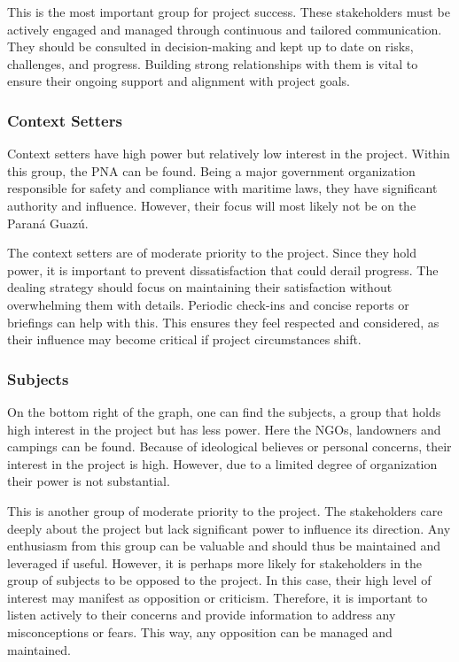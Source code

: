 This is the most important group for project success. These stakeholders must be actively engaged and managed through continuous and tailored communication. They should be consulted in decision-making and kept up to date on risks, challenges, and progress. Building strong relationships with them is vital to ensure their ongoing support and alignment with project goals.

\subsubsection{Context Setters}
Context setters have high power but relatively low interest in the project. Within this group, the PNA can be found. Being a major government organization responsible for safety and compliance with maritime laws, they have significant authority and influence. However, their focus will most likely not be on the Paraná Guazú.

The context setters are of moderate priority to the project. Since they hold power, it is important to prevent dissatisfaction that could derail progress. The dealing strategy should focus on maintaining their satisfaction without overwhelming them with details. Periodic check-ins and concise reports or briefings can help with this. This ensures they feel respected and considered, as their influence may become critical if project circumstances shift.

\subsubsection{Subjects}
On the bottom right of the graph, one can find the subjects, a group that holds high interest in the project but has less power. Here the NGOs, landowners and campings can be found. Because of ideological believes or personal concerns, their interest in the project is high. However, due to a limited degree of organization their power is not substantial.

This is another group of moderate priority to the project. The stakeholders care deeply about the project but lack significant power to influence its direction. Any enthusiasm from this group can be valuable and should thus be maintained and leveraged if useful. However, it is perhaps more likely for stakeholders in the group of subjects to be opposed to the project. In this case, their high level of interest may manifest as opposition or criticism. Therefore, it is important to listen actively to their concerns and provide information to address any misconceptions or fears. This way, any opposition can be managed and maintained.

